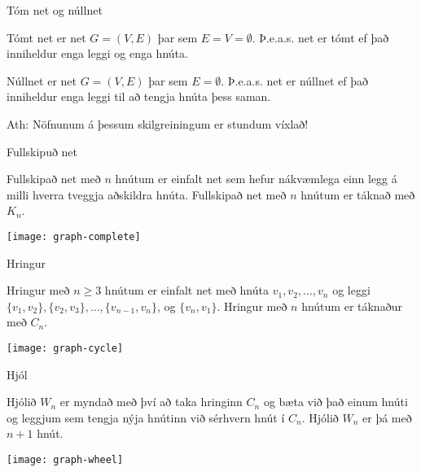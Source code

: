 \documentclass[handout]{beamer}
\begin{document}
\begin{frame}{Tóm net og núllnet}
\begin{tcolorbox}[title=Tómt net]
Tómt net er net $G = (V, E)$ þar sem $E = V = \emptyset$. Þ.e.a.s. net er tómt ef það inniheldur enga leggi og enga hnúta.
\end{tcolorbox}

\begin{tcolorbox}[title=Núllnet]
Núllnet er net $G = (V, E)$ þar sem $E = \emptyset$. Þ.e.a.s. net er núllnet ef það inniheldur enga leggi til að tengja hnúta þess saman.
\end{tcolorbox}
Ath: Nöfnunum á þessum skilgreiningum er stundum víxlað!
\end{frame}

\begin{frame}{Fullskipuð net}
\begin{tcolorbox}[title=Fullskipað net]
Fullskipað net með $n$ hnútum er einfalt net sem hefur nákvæmlega einn legg á milli hverra tveggja aðskildra hnúta. Fullskipað net með $n$ hnútum er táknað með $K_n$.
\end{tcolorbox}

\begin{center}
\texttt{[image: graph-complete]}
\end{center}

\end{frame}

\begin{frame}{Hringur}
\begin{tcolorbox}[title=Hringur]
Hringur með $n \geq 3$ hnútum er einfalt net með hnúta $v_1, v_2, \ldots, v_n$ og leggi $\{v_1 , v_2\},
\{v_2 , v_3 \}, \ldots , \{v_{n-1} , v_n \}$, og $\{v_n , v_1 \}$. Hringur með $n$ hnútum er táknaður með $C_n$.
\end{tcolorbox}

\begin{center}
\texttt{[image: graph-cycle]}
\end{center}

\end{frame}

\begin{frame}{Hjól}
\begin{tcolorbox}[title=Hjól]
Hjólið $W_n$ er myndað með því að taka hringinn $C_n$ og bæta við það einum hnúti og leggjum sem tengja nýja hnútinn við sérhvern hnút í $C_n$. Hjólið $W_n$ er þá með $n+1$ hnút.
\end{tcolorbox}

\begin{center}
\texttt{[image: graph-wheel]}
\end{center}
\end{frame}
\end{document}
